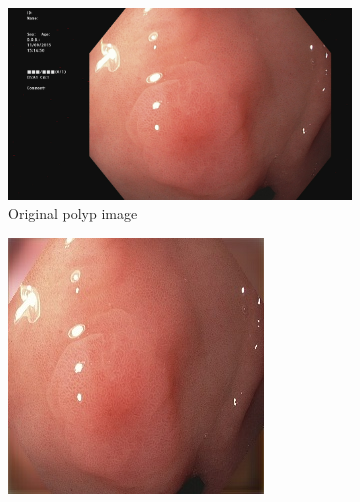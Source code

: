 \begin{figure}[h]
        \tiny
        \begin{subfigure}[t]{\myfigsizethree}
            \centering
            \includegraphics[height=\textwidth, width=\textwidth]{experiments/figures/blackcorner/polypORIG.jpg}
            \caption{Original polyp image }    
            \label{fig:polyp_ORIG_CORNER1}
        \end{subfigure}
        \qquad
        \begin{subfigure}[t]{\myfigsizethree}
            \centering
            \includegraphics[width=\textwidth]{experiments/figures/blackcorner/polypAE.jpg}

\end{subfigure}
\end{figure}
